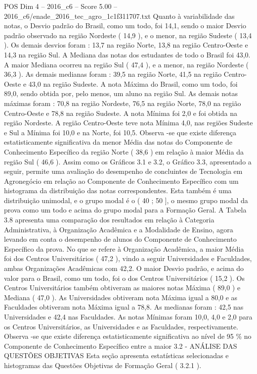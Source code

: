 \begin{textsample}{POS Dim 4 – 2016\_c6 – Score 5.00 – 2016\_c6/enade\_2016\_tec\_agro\_1c1f311707.txt}
Quanto à variabilidade das notas, o Desvio padrão do Brasil, como um todo, foi 14,1, sendo o maior Desvio padrão observado na região Nordeste ( 14,9 ), e o menor, na região Sudeste ( 13,4 ).
Os demais desvios foram : 13,7 na região Norte, 13,8 na região Centro-Oeste e 14,3 na região Sul.
A Mediana das notas dos estudantes de todo o Brasil foi 43,0.
A maior Mediana ocorreu na região Sul ( 47,4 ), e a menor, na região Nordeste ( 36,3 ).
As demais medianas foram : 39,5 na região Norte, 41,5 na região Centro-Oeste e 43,0 na região Sudeste.
A nota Máxima do Brasil, como um todo, foi 89,0, sendo obtida por, pelo menos, um aluno na região Sul.
As demais notas máximas foram : 70,8 na região Nordeste, 76,5 na região Norte, 78,0 na região Centro-Oeste e 78,8 na região Sudeste.
A nota Mínima foi 2,0 e foi obtida na região Nordeste.
A região Centro-Oeste teve nota Mínima 4,0, nas regiões Sudeste e Sul a Mínima foi 10,0 e na Norte, foi 10,5.
Observa -se que existe diferença estatisticamente significativa da menor Média das notas do Componente de Conhecimento Específico da região Norte ( 38,6 ) em relação à maior Média da região Sul ( 46,6 ).
Assim como os Gráficos 3.1 e 3.2, o Gráfico 3.3, apresentado a seguir, permite uma avaliação do desempenho de concluintes de Tecnologia em Agronegócio em relação ao Componente de Conhecimento Específico com um histograma da distribuição das notas correspondentes.
Esta também é uma distribuição unimodal, e o grupo modal é o ( 40 ; 50 ], o mesmo grupo modal da prova como um todo e acima do grupo modal para a Formação Geral.
A Tabela 3.8 apresenta uma comparação dos resultados em relação à Categoria Administrativa, à Organização Acadêmica e a Modalidade de Ensino, agora levando em conta o desempenho de alunos do Componente de Conhecimento Específico da prova.
No que se refere à Organização Acadêmica, a maior Média foi dos Centros Universitários ( 47,2 ), vindo a seguir Universidades e Faculdades, ambas Organizações Acadêmicas com 42,2.
O maior Desvio padrão, e acima do valor para o Brasil, como um todo, foi o dos Centros Universitários ( 15,2 ).
Os Centros Universitários também obtiveram as maiores notas Máxima ( 89,0 ) e Mediana ( 47,0 ).
As Universidades obtiveram nota Máxima igual a 80,0 e as Faculdades obtiveram nota Máxima igual a 78,8.
As medianas foram : 42,5 nas Universidades e 42,4 nas Faculdades.
As notas Mínimas foram 10,0, 4,0 e 2,0 para os Centros Universitários, as Universidades e as Faculdades, respectivamente.
Observa -se que existe diferença estatisticamente significativa ao nível de 95 \% no Componente de Conhecimento Específico entre a maior 3.2 - ANÁLISE DAS QUESTÕES OBJETIVAS Esta seção apresenta estatísticas selecionadas e histogramas das Questões Objetivas de Formação Geral ( 3.2.1 ).

\end{textsample}
